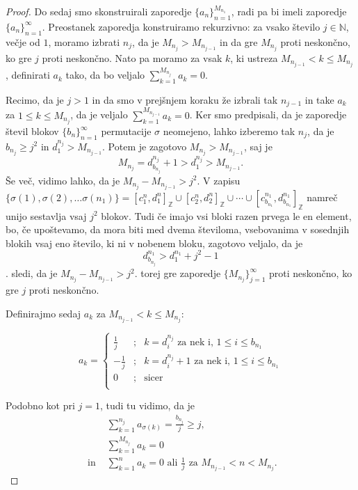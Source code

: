 \documentclass[12pt,a4paper,reqno]{amsart}
\theoremstyle{definition} %
\theoremstyle{plain} %
\newcommand{\N}{\mathbb N}
\newcommand{\Z}{\mathbb Z}
\begin{document}
\begin{proof}
Do sedaj smo skonstruirali zaporedje $\{a_n\}^{M_{n_1}}_{n=1}$, radi pa bi imeli zaporedje $\{a_n\}^{\infty}_{n=1}$. Preostanek zaporedja konstruiramo rekurzivno: za vsako število $j\in \N$, večje od $1$, moramo izbrati $n_j$, da je $M_{n_j}>M_{n_{j-1}}$ in da gre $M_{n_j}$ proti neskončno, ko gre $j$ proti neskončno. Nato pa moramo za vsak $k$, ki ustreza $M_{n_{j-1}}<k\leq M_{n_j}$, definirati $a_k$ tako, da bo veljalo $\sum_{k=1}^{M_{n_j}}a_k=0$.

Recimo, da je $j>1$ in da smo v prejšnjem koraku že izbrali tak $n_{j-1}$ in take $a_k$ za $1\leq k\leq M_{n_j}$, da je veljalo $\sum_{k=1}^{M_{n_{j-1}}}a_k=0$. Ker smo predpisali, da je zaporedje števil blokov $\{b_n\}^{\infty}_{n=1}$ permutacije $\sigma$ neomejeno, lahko izberemo tak $n_j$, da je$b_{n_j}\geq j^2$ in $d_1^{n_j}>M_{n_{j-1}}$. 
Potem je zagotovo $M_{n_j} > M_{n_{j-1}}$, saj je $$M_{n_j}=d_{b_{n_j}}^{n_j} +1 > d_1^{n_j} > M_{n_{j-1}}.$$
Še več, vidimo lahko, da je $M_{n_j}-M_{n_{j-1}}>j^2$. V zapisu $\{ \sigma (1), \sigma (2), \ldots \sigma (n_1) \}= [c^n_1, d^n_1]_{\Z} \cup [c^n_2, d^n_2]_{\Z} \cup \cdots \cup [c^{n_1}_{b_{n_1}}, d^{n_1}_{b_{n_1}}]_{\Z}$ namreč unijo sestavlja vsaj $j^2$ blokov. Tudi če imajo vsi bloki razen prvega le en element, bo, če upoštevamo, da mora biti med dvema številoma, vsebovanima v sosednjih blokih vsaj eno število, ki ni v nobenem bloku, zagotovo veljalo, da je $$d_{b_{n_j}}^{n_1}>d_1^{n_1}+j^2 -1$$. sledi, da je $M_{n_j}-M_{n_{j-1}}>j^2$. torej gre zaporedje $\{M_{n_j}\}_{j=1}^{\infty}$ proti neskončno, ko gre $j$ proti neskončno.

Definirajmo sedaj $a_k$ za $M_{n_{j-1}}<k\leq M_{n_j}$:

$$a_k = 
\left\{ 
\begin{array}{ccc}
\frac{1}{j}&;&k=d_i^{n_j}\textrm{ za nek i, }1\leq i \leq b_{n_1}\\
-\frac{1}{j}&;&k=d_i^{n_j}+1\textrm{ za nek i, }1\leq i \leq b_{n_1}\\
0&;&\textrm{sicer}\\
\end{array}
\right. 
$$

Podobno kot pri $j=1$, tudi tu vidimo, da je 
\begin{align}
&\sum_{k=1}^{n_j}a_{\sigma(k)}=\frac{b_{n_j}}{j}\geq j, \label{eq:12} \\
&\sum_{k=1}^{M_{n_j}}a_k=0 \label{eq:13}\\
\textrm{ in }&\sum_{k=1}^{n}a_k=0\textrm{ ali }\frac{1}{j}\textrm{ za }M_{n_{j-1}}<n<M_{n_j}. \label{eq:14}
\end{align}


\end{proof}
\end{document}
